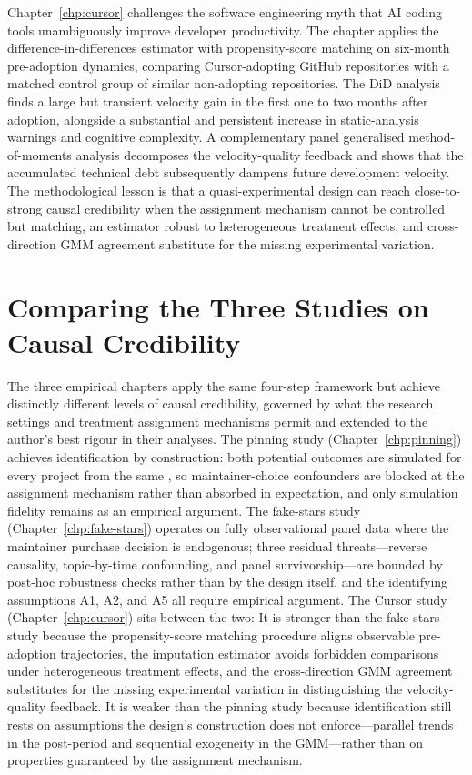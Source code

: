 Chapter~\ref{chp:cursor} challenges the software engineering myth that AI coding tools unambiguously improve developer productivity.
The chapter applies the \citet{borusyak2024revisiting} difference-in-differences estimator with propensity-score matching on six-month pre-adoption dynamics, comparing Cursor-adopting GitHub repositories with a matched control group of similar non-adopting repositories.
The DiD analysis finds a large but transient velocity gain in the first one to two months after adoption, alongside a substantial and persistent increase in static-analysis warnings and cognitive complexity.
A complementary panel generalised method-of-moments analysis decomposes the velocity-quality feedback and shows that the accumulated technical debt subsequently dampens future development velocity.
The methodological lesson is that a quasi-experimental design can reach close-to-strong causal credibility when the assignment mechanism cannot be controlled but matching, an estimator robust to heterogeneous treatment effects, and cross-direction GMM agreement substitute for the missing experimental variation.

\section{Comparing the Three Studies on Causal Credibility}
\label{sec:conclusion-comparison}

The three empirical chapters apply the same four-step framework but achieve distinctly different levels of causal credibility, governed by what the research settings and treatment assignment mechanisms permit and extended to the author's best rigour in their analyses.
The pinning study (Chapter~\ref{chp:pinning}) achieves identification by construction: both potential outcomes are simulated for every project from the same , so maintainer-choice confounders are blocked at the assignment mechanism rather than absorbed in expectation, and only simulation fidelity remains as an empirical argument.
The fake-stars study (Chapter~\ref{chp:fake-stars}) operates on fully observational panel data where the maintainer purchase decision is endogenous; three residual threats---reverse causality, topic-by-time confounding, and panel survivorship---are bounded by post-hoc robustness checks rather than by the design itself, and the identifying assumptions A1, A2, and A5 all require empirical argument.
The Cursor study (Chapter~\ref{chp:cursor}) sits between the two: It is stronger than the fake-stars study because the propensity-score matching procedure aligns observable pre-adoption trajectories, the \citet{borusyak2024revisiting} imputation estimator avoids forbidden comparisons under heterogeneous treatment effects, and the cross-direction GMM agreement substitutes for the missing experimental variation in distinguishing the velocity-quality feedback.
It is weaker than the pinning study because identification still rests on assumptions the design's construction does not enforce---parallel trends in the post-period and sequential exogeneity in the GMM---rather than on properties guaranteed by the assignment mechanism.

